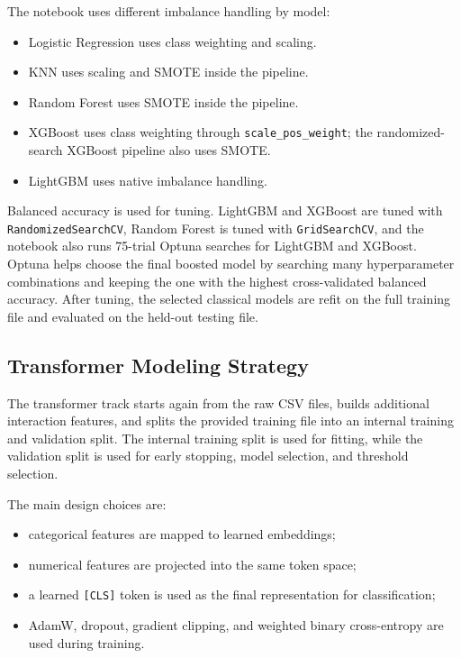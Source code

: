 \documentclass[10pt,twocolumn]{article}
\begin{document}
The notebook uses different imbalance handling by model:
\begin{itemize}
  \item Logistic Regression uses class weighting and scaling.
  \item KNN uses scaling and SMOTE inside the pipeline.
  \item Random Forest uses SMOTE inside the pipeline.
  \item XGBoost uses class weighting through \texttt{scale\_pos\_weight}; the randomized-search XGBoost pipeline also uses SMOTE.
  \item LightGBM uses native imbalance handling.
\end{itemize}

Balanced accuracy is used for tuning. LightGBM and XGBoost are tuned with \texttt{RandomizedSearchCV}, Random Forest is tuned with \texttt{GridSearchCV}, and the notebook also runs 75-trial Optuna searches for LightGBM and XGBoost. Optuna helps choose the final boosted model by searching many hyperparameter combinations and keeping the one with the highest cross-validated balanced accuracy. After tuning, the selected classical models are refit on the full training file and evaluated on the held-out testing file.

\subsection{Transformer Modeling Strategy}

The transformer track starts again from the raw CSV files, builds additional interaction features, and splits the provided training file into an internal training and validation split. The internal training split is used for fitting, while the validation split is used for early stopping, model selection, and threshold selection.

The main design choices are:
\begin{itemize}
  \item categorical features are mapped to learned embeddings;
  \item numerical features are projected into the same token space;
  \item a learned \texttt{[CLS]} token is used as the final representation for classification;
  \item AdamW, dropout, gradient clipping, and weighted binary cross-entropy are used during training.
\end{itemize}
\end{document}
